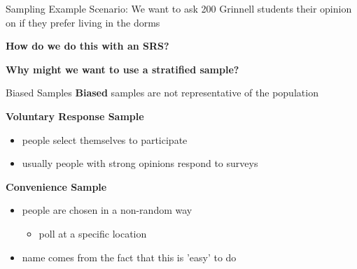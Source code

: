 \documentclass{beamer}
\begin{document}
\begin{frame}{Sampling Example}
Scenario: We want to ask 200 Grinnell students their opinion on if they prefer living in the dorms \vspace{8mm}

\textbf{How do we do this with an SRS?} \vspace{8mm}

\textbf{Why might we want to use a stratified sample?}

\end{frame}



\begin{frame}{Biased Samples}
\textbf{Biased} samples are not representative of the population \vspace{4mm}

\textbf{Voluntary Response Sample}
\begin{itemize}
    \item people select themselves to participate
    \item usually people with strong opinions respond to surveys
\end{itemize} \vspace{4mm}

\textbf{Convenience Sample}
\begin{itemize}
    \item people are chosen in a non-random way
        \begin{itemize}
            \item poll at a specific location
        \end{itemize}
    \item name comes from the fact that this is 'easy' to do
\end{itemize}
\end{frame}
\end{document}
